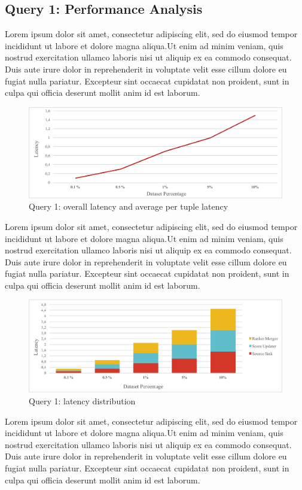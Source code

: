 \subsection{Query 1: Performance Analysis}
\label{sec:evaluation-q1}

Lorem ipsum dolor sit amet, consectetur adipiscing elit, sed do eiusmod tempor incididunt ut labore et dolore magna aliqua.Ut enim ad minim veniam, quis nostrud exercitation ullamco laboris nisi ut aliquip ex ea commodo consequat. Duis aute irure dolor in reprehenderit in voluptate velit esse cillum dolore eu fugiat nulla pariatur. Excepteur sint occaecat cupidatat non proident, sunt in culpa qui officia deserunt mollit anim id est laborum.

\begin{figure}
	\centering
	\includegraphics[width=\columnwidth]{fig/query-1-latencies}
	\caption{Query 1: overall latency and average per tuple latency}
	\label{fig:query-1-latencies}
\end{figure}

Lorem ipsum dolor sit amet, consectetur adipiscing elit, sed do eiusmod tempor incididunt ut labore et dolore magna aliqua.Ut enim ad minim veniam, quis nostrud exercitation ullamco laboris nisi ut aliquip ex ea commodo consequat. Duis aute irure dolor in reprehenderit in voluptate velit esse cillum dolore eu fugiat nulla pariatur. Excepteur sint occaecat cupidatat non proident, sunt in culpa qui officia deserunt mollit anim id est laborum.

\begin{figure}
	\centering
	\includegraphics[width=\columnwidth]{fig/query-1-latency-distribution}
	\caption{Query 1: latency distribution}
	\label{fig:query-1-latency-distribution}
\end{figure}

Lorem ipsum dolor sit amet, consectetur adipiscing elit, sed do eiusmod tempor incididunt ut labore et dolore magna aliqua.Ut enim ad minim veniam, quis nostrud exercitation ullamco laboris nisi ut aliquip ex ea commodo consequat. Duis aute irure dolor in reprehenderit in voluptate velit esse cillum dolore eu fugiat nulla pariatur. Excepteur sint occaecat cupidatat non proident, sunt in culpa qui officia deserunt mollit anim id est laborum.